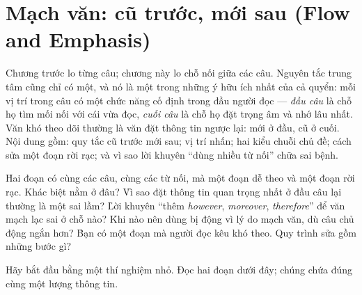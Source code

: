 \documentclass[../../english.tex]{subfiles}
\begin{document}
\chapter{Mạch văn: cũ trước, mới sau (Flow and Emphasis)}

\begin{tomtat}
Chương trước lo từng câu; chương này lo chỗ nối giữa các câu. Nguyên tắc trung tâm cũng chỉ có một, và nó là một trong những ý hữu ích nhất của cả quyển\cite{gopenswan1990}: mỗi vị trí trong câu có một chức năng cố định trong đầu người đọc --- \emph{đầu câu} là chỗ họ tìm mối nối với cái vừa đọc, \emph{cuối câu} là chỗ họ đặt trọng âm và nhớ lâu nhất. Văn khó theo dõi thường là văn đặt thông tin ngược lại: mới ở đầu, cũ ở cuối. Nội dung gồm: quy tắc cũ trước mới sau; vị trí nhấn; hai kiểu chuỗi chủ đề; cách sửa một đoạn rời rạc; và vì sao lời khuyên ``dùng nhiều từ nối'' chữa sai bệnh.
\end{tomtat}

\begin{nentang}
\end{nentang}

\begin{khoigoi}
\h{Hai đoạn có cùng các câu, cùng các từ nối, mà một đoạn dễ theo và một đoạn rời rạc. Khác biệt nằm ở đâu?}
\h{Vì sao đặt thông tin quan trọng nhất ở đầu câu lại thường là một sai lầm?}
\h{Lời khuyên ``thêm \emph{however}, \emph{moreover}, \emph{therefore}'' để văn mạch lạc sai ở chỗ nào?}
\h{Khi nào nên dùng bị động vì lý do mạch văn, dù câu chủ động ngắn hơn?}
\h{Bạn có một đoạn mà người đọc kêu khó theo. Quy trình sửa gồm những bước gì?}
\end{khoigoi}

Hãy bắt đầu bằng một thí nghiệm nhỏ. Đọc hai đoạn dưới đây; chúng chứa đúng cùng một lượng thông tin.
\end{document}
